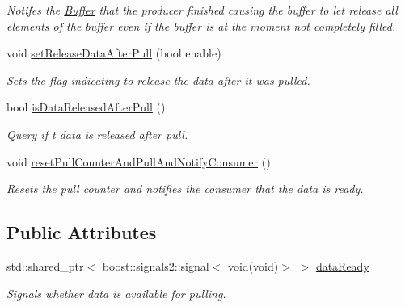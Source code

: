\begin{DoxyCompactItemize}
\begin{DoxyCompactList}\small\item\em Notifes the \hyperlink{class_buffer}{Buffer} that the producer finished causing the buffer to let release all elements of the buffer even if the buffer is at the moment not completely filled. \end{DoxyCompactList}\item 
void \hyperlink{class_buffer_a163cb773d0bb6efefda50a7206c0f5f6}{set\+Release\+Data\+After\+Pull} (bool enable)
\begin{DoxyCompactList}\small\item\em Sets the flag indicating to release the data after it was pulled. \end{DoxyCompactList}\item 
bool \hyperlink{class_buffer_ad6142214f69f88ddde8fea68339eda01}{is\+Data\+Released\+After\+Pull} ()
\begin{DoxyCompactList}\small\item\em Query if t data is released after pull. \end{DoxyCompactList}\item 
\hypertarget{class_buffer_aba610c23849b04e98c488d81f7598a4a}{}void \hyperlink{class_buffer_aba610c23849b04e98c488d81f7598a4a}{reset\+Pull\+Counter\+And\+Pull\+And\+Notify\+Consumer} ()\label{class_buffer_aba610c23849b04e98c488d81f7598a4a}

\begin{DoxyCompactList}\small\item\em Resets the pull counter and notifies the consumer that the data is ready. \end{DoxyCompactList}\end{DoxyCompactItemize}
\subsection*{Public Attributes}
\begin{DoxyCompactItemize}
\item 
\hypertarget{class_buffer_a721d57441cebb423dd23d2779749ad90}{}std\+::shared\+\_\+ptr$<$ boost\+::signals2\+::signal$<$ void(void)$>$ $>$ \hyperlink{class_buffer_a721d57441cebb423dd23d2779749ad90}{data\+Ready}\label{class_buffer_a721d57441cebb423dd23d2779749ad90}

\begin{DoxyCompactList}\small\item\em Signals whether data is available for pulling. \end{DoxyCompactList}\end{DoxyCompactItemize}


